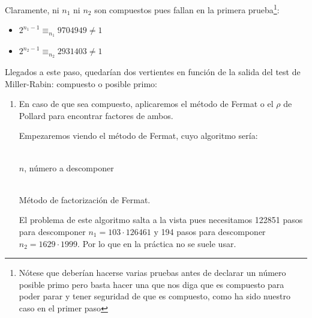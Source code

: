 \begin{enumerate}
		Claramente, ni $n_1$ ni $n_2$ son compuestos pues fallan en la primera prueba\footnote{Nótese que deberían
		hacerse varias pruebas antes de declarar un número posible primo pero basta hacer una que nos diga que es
		compuesto para poder parar y tener seguridad de que es compuesto, como ha sido nuestro caso en el primer
		paso}:
		\begin{itemize}
			\item $2^{n_1-1} \equiv_{n_1} 9704949 \neq 1$
			\item $2^{n_2-1} \equiv_{n_2} 2931403 \neq 1$
		\end{itemize}
		
		Llegados a este paso, quedarían dos vertientes en función de la salida del test de Miller-Rabin: compuesto
		o posible primo:
		
		\begin{enumerate}
			\item En caso de que sea compuesto, aplicaremos el método de Fermat o el $\rho$ de Pollard para
			encontrar factores de ambos.
			
			Empezaremos viendo el método de Fermat, cuyo algoritmo sería:
			\begin{algorithm}[H]
			\begin{algorithmic}[1]
				\REQUIRE \ \\
					\texttt{$n$}, número a descomponer \\ \
				\ELSE
						\ENDIF
					\ENDWHILE
				\ENDIF
			\end{algorithmic}
			\caption{Método de factorización de Fermat.}
			\label{Fermat-factors}
			\end{algorithm}
			
			El problema de este algoritmo salta a la vista pues necesitamos 122851 pasos para descomponer
			$n_1 = 103 \cdot 126461$ y 194 pasos para descomponer $n_2 = 1629 \cdot 1999$. Por lo que en la
			práctica no se suele usar.
			

\end{enumerate}
\end{enumerate}
